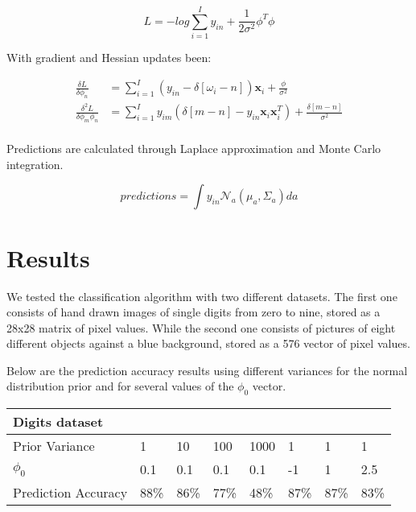 \documentclass[12pt]{article}
\begin{document}
\begin{equation}
\label{L}
L = - log \sum_{i = 1}^{I} y_{in} + \frac{1}{2 \sigma^{2}} \phi^{T} \phi 
\end{equation}

With gradient and Hessian updates been:

\begin{align}
\label{Grad-Hess-Update}
\frac{\delta L}{ \delta \phi_{n}} &= \sum_{i = 1}^{I} \left( y_{in} - \delta \left[ \omega_{i} - n \right] \right) \mathbf{x}_{i}  + \frac{\phi} {\sigma^{2}} \nonumber \\
\frac{\delta^{2} L}{ \delta \phi_{m}\phi_{n}} &= \sum_{i = 1}^{I} y_{im} \left( \delta \left[ m - n \right] - y_{in} \mathbf{x}_{i} \mathbf{x}_{i}^{T}  \right) +  \frac{\delta \left[ m - n \right]}{\sigma^{2}} \nonumber \\
\end{align}

Predictions are calculated through Laplace approximation and Monte Carlo integration.

\begin{equation}
\label{Predictions}
predictions = \int y_{in} \mathcal{N}_{a} \left( \mu_{a}, \Sigma_{a} \right) da
\end{equation}
 
\section{Results}

We tested the classification algorithm with two different datasets.
The first one consists of hand drawn images of single digits from zero to nine,
stored as a 28x28 matrix of pixel values.
While the second one consists of pictures of eight different objects against a blue background, stored as a 576 vector of pixel values.

Below are the prediction accuracy results using different variances for the normal distribution prior and for several values of the $\phi_{0}$ vector. 

\begin{table}[h]
\begin{tabular}{l|lllllll}
Digits dataset &  &  &  &  &  &  &  \\ \hline
Prior Variance & \multicolumn{1}{l|}{1} & \multicolumn{1}{l|}{10} & \multicolumn{1}{l|}{100} & \multicolumn{1}{l|}{1000} & \multicolumn{1}{l|}{1} & \multicolumn{1}{l|}{1} & \multicolumn{1}{l|}{1} \\ \hline
$\phi_{0}$ & \multicolumn{1}{l|}{0.1} & \multicolumn{1}{l|}{0.1} & \multicolumn{1}{l|}{0.1} & \multicolumn{1}{l|}{0.1} & \multicolumn{1}{l|}{-1} & \multicolumn{1}{l|}{1} & \multicolumn{1}{l|}{2.5} \\ \hline
Prediction Accuracy & \multicolumn{1}{l|}{88\%} & \multicolumn{1}{l|}{86\%} & \multicolumn{1}{l|}{77\%} & \multicolumn{1}{l|}{48\%} & \multicolumn{1}{l|}{87\%} & \multicolumn{1}{l|}{87\%} & \multicolumn{1}{l|}{83\%} \\ \hline
\end{tabular}
\end{table}
\end{document}

